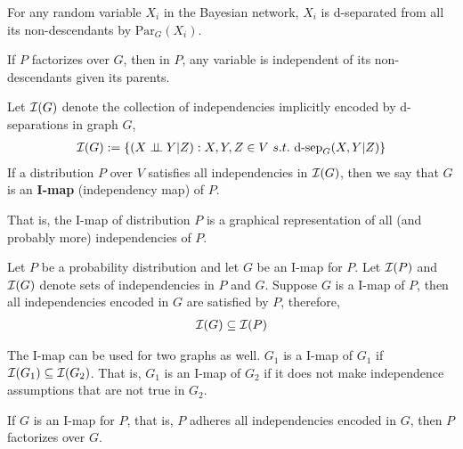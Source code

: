 \documentclass[11pt]{article}
\newcommand{\dsep}[0]{\text{d-sep}}
\newcommand{\pa}[0]{\text{Par}}
\begin{document}
	\begin{theorem}
		For any random variable $X_i$ in the Bayesian network, $X_i$ is d-separated from all its non-descendants by $\pa_G(X_i)$.
	\end{theorem}
	
	\begin{corollary}
		If $P$ factorizes over $G$, then in $P$, any variable is independent of its non-descendants given its parents.
	\end{corollary}
	
	\begin{definition}
		Let $\mathcal{{I}}(G)$ denote the collection of independencies implicitly encoded by d-separations in graph $G$,
		\begin{align}
			\mc{I}(G) := \{(X\indep Y|Z): X, Y, Z \in V\ s.t.\ \dsep_G (X, Y | Z)\}
		\end{align}
		If a distribution $P$ over $V$ satisfies all independencies in $\mathcal{{I}}(G)$, then we say that $G$ is an \textbf{I-map} (independency map) of $P$.
		
		That is, the I-map of distribution $P$ is a graphical representation of all (and probably more) independencies of $P$.
	\end{definition}
	
	\begin{example}
		Let $P$ be a probability distribution and let $G$ be an I-map for $P$. Let $\mathcal{{I}}(P)$ and $\mathcal{{I}}(G)$ denote sets of independencies in $P$ and $G$.
		Suppose $G$ is a I-map of $P$, then all independencies encoded in $G$ are satisfied by $P$, therefore,
		\begin{align}
			\mathcal{{I}}(G) \subseteq \mathcal{{I}}(P)
		\end{align}
	\end{example}
	
	\begin{example}
		The I-map can be used for two graphs as well. $G_1$ is a I-map of $G_1$ if $\mathcal{{I}}(G_1) \subseteq \mathcal{{I}}(G_2)$.
		That is, $G_1$ is an I-map of $G_2$ if it does not make independence assumptions that are not true in $G_2$.
	\end{example}
	
	\begin{theorem}
		If $G$ is an I-map for $P$, that is, $P$ adheres all independencies encoded in $G$, then $P$ factorizes over $G$.
%			
	\end{theorem}
\end{document}
